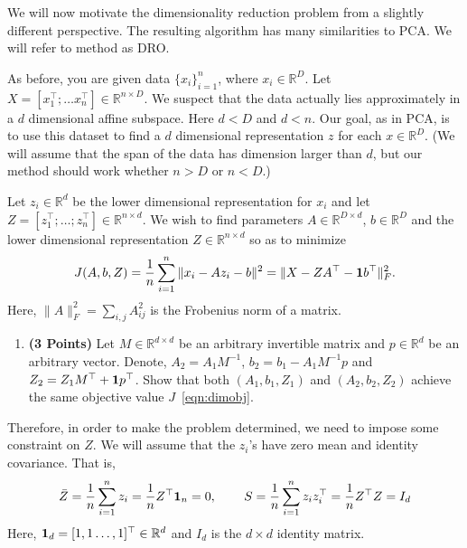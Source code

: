 \documentclass[a4paper]{article}
\newcounter{thm}
\newcommand*{\one}{{\bf 1}}
\newcommand{\Zbar}{\bar{Z}}
\theoremstyle{definition}
\newcommand{\RR}{\mathbb{R}}
\begin{document}
We will now motivate the dimensionality reduction problem from a slightly different
perspective. The resulting algorithm has many similarities to PCA.
We will refer to method as DRO.

As before, you are given data $\{x_i\}_{i=1}^n$, where $x_i \in \RR^D$. Let $X=[x_1^\top; \dots
	x_n^\top] \in \RR^{n\times D}$. We suspect that the data
actually lies approximately in  a $d$ dimensional affine subspace.
Here $d<D$ and $d<n$.
Our goal, as in PCA, is to use this dataset to find a $d$ dimensional representation $z$ for each $x\in\RR^D$.
(We will assume that the span of the data has dimension larger than
$d$, but our method should work whether $n>D$ or $n<D$.)


Let $z_i\in \RR^d$ be the lower dimensional representation for $x_i$ and
let $Z = [z_1^\top; \dots; z_n^\top] \in \RR^{n\times d}$.
We wish to find parameters $A \in \RR^{D\times d}$, $b\in\RR^D$ and the lower
dimensional representation $Z\in \RR^{n\times d}$ so as to minimize
\begin{equation}
	J(A,b,Z) = \frac{1}{n} \sum_{i=1}^n \|x_i - Az_i - b\|^2 = \| X - ZA^\top - \one b^\top\|_F^2.
	\label{eqn:dimobj}
\end{equation}
Here, $\|A\|^2_F = \sum_{i,j} A_{ij}^2$ is the Frobenius norm of a matrix.


\begin{enumerate}
	\item \textbf{(3 Points)}
	      Let $M\in\RR^{d\times d}$ be an arbitrary invertible matrix and $p\in\RR^{d}$ be an arbitrary vector.
	      Denote, $A_2 = A_1M^{-1}$, $b_2 = b_1- A_1M^{-1}p$ and $Z_2 = Z_1 M^\top +
		      \one p^\top$.
	      Show that both
	      $(A_1, b_1, Z_1)$ and $(A_2, b_2, Z_2)$ achieve the same objective value $J$~\eqref{eqn:dimobj}.
\end{enumerate}

Therefore, in order to make the problem determined, we need to impose some
constraint on $Z$. We will assume that the $z_i$'s have zero mean and identity covariance.
That is,
\begin{align*}
	\Zbar = \frac{1}{n} \sum_{i=1}^n z_i =\frac{1}{n} Z^\top {\bf 1}_n = 0, \hspace{0.3in}
	S = \frac{1}{n} \sum_{i=1}^n z_i z_i^\top
	= \frac{1}{n} Z^\top Z
	= I_d
\end{align*}
Here, ${\bf 1}_d = [1, 1 \dots, 1]^\top \in\RR^d$ and $I_d$  is the $d\times d$ identity matrix.
\end{document}
